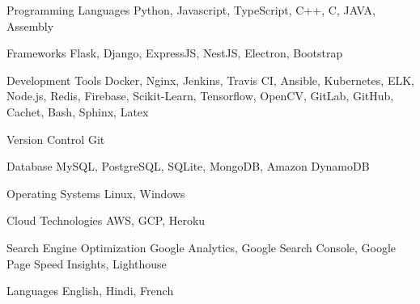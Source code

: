 

\begin{cvskills}

  \cvskill
    {Programming Languages} %
    {Python, Javascript, TypeScript, C++, C, JAVA, Assembly} %
    
  \cvskill
    {Frameworks} %
    {Flask, Django, ExpressJS, NestJS, Electron, Bootstrap} %

  \cvskill
    {Development Tools} %
    {Docker, Nginx, Jenkins, Travis CI, Ansible, Kubernetes, ELK, Node.js, Redis, Firebase, Scikit-Learn, Tensorflow, OpenCV, GitLab, GitHub, Cachet, Bash, Sphinx, Latex} %
    
  \cvskill
    {Version Control} %
    {Git} %
    
  \cvskill
    {Database} %
    {MySQL, PostgreSQL, SQLite, MongoDB, Amazon DynamoDB} %

  \cvskill
    {Operating Systems} %
    {Linux, Windows} %

  \cvskill
    {Cloud Technologies} %
    {AWS, GCP, Heroku} %

  \cvskill
    {Search Engine Optimization} %
    {Google Analytics, Google Search Console, Google Page Speed Insights, Lighthouse} %
    
  \cvskill
    {Languages} %
    {English, Hindi, French} %

\end{cvskills}
